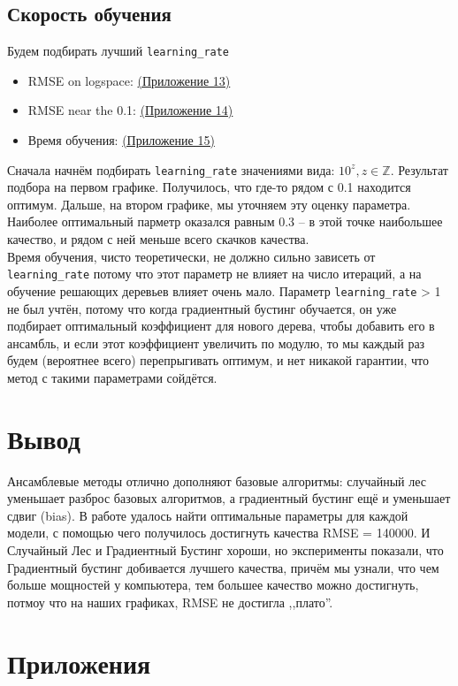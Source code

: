\documentclass[12pt]{report}
\renewcommand{\thesection}{\arabic{section}}
\begin{document}
\subsection{Скорость обучения}
Будем подбирать лучший \verb|learning_rate|
\begin{itemize}
    \item RMSE on logspace: \hyperref[fig::app13]{(Приложение 13)}
    \item RMSE near the 0.1: \hyperref[fig::app14]{(Приложение 14)}
    \item Время обучения: \hyperref[fig::app15]{(Приложение 15)}
\end{itemize}
Сначала начнём подбирать \verb|learning_rate| значениями вида: $10^z, z \in \mathbb{Z}$.
Результат подбора на первом графике.
Получилось, что где-то рядом с 0.1 находится оптимум.
Дальше, на втором графике, мы уточняем эту оценку параметра.
Наиболее оптимальный парметр оказался равным 0.3 -- в этой точке наибольшее
качество, и рядом с ней меньше всего скачков качества.  \\
Время обучения, чисто теоретически, не должно сильно зависеть от \verb|learning_rate|
потому что этот параметр не влияет на число итераций, а на обучение решающих деревьев
влияет очень мало. Параметр \verb|learning_rate| > 1 не был учтён, потому что когда 
градиентный бустинг обучается, он уже подбирает оптимальный коэффициент для нового дерева,
чтобы добавить его в ансамбль, и если этот коэффициент увеличить по модулю, то мы каждый
раз будем (вероятнее всего) перепрыгивать оптимум, и нет никакой гарантии, что метод
с такими параметрами сойдётся. 

\section{Вывод}
Ансамблевые методы отлично дополняют базовые алгоритмы: случайный лес уменьшает разброс
базовых алгоритмов, а градиентный бустинг ещё и уменьшает сдвиг (bias).
В работе удалось найти оптимальные параметры для каждой модели, с помощью чего получилось
достигнуть качества RMSE = 140000. И Случайный Лес и Градиентный Бустинг хороши,
но эксперименты показали, что Градиентный бустинг добивается лучшего качества, причём
мы узнали, что чем больше мощностей у компьютера, тем большее качество можно достигнуть,
потмоу что на наших графиках, RMSE не достигла ,,плато''.

\section{Приложения}
\renewcommand\thefigure{\thesection.\arabic{figure}}  
\setcounter{figure}{0}  
\renewcommand{\figurename}{Прил.}
\end{document}
